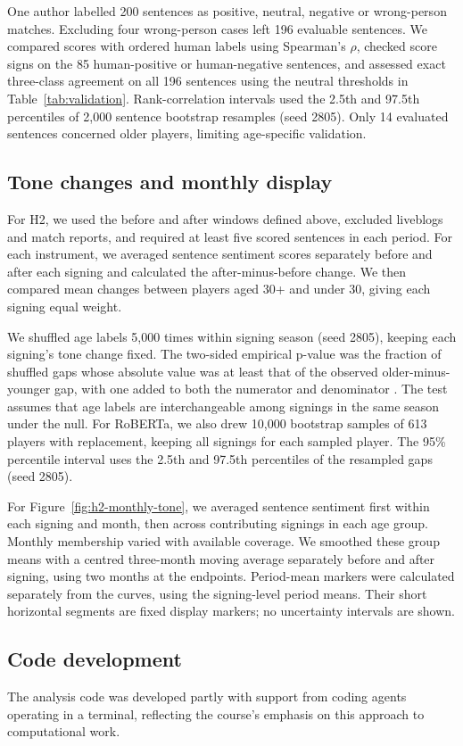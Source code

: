 One author labelled 200 sentences as positive, neutral, negative or wrong-person matches. Excluding four wrong-person cases left 196 evaluable sentences. We compared scores with ordered human labels using Spearman's $\rho$, checked score signs on the 85 human-positive or human-negative sentences, and assessed exact three-class agreement on all 196 sentences using the neutral thresholds in Table~\ref{tab:validation}. Rank-correlation intervals used the 2.5th and 97.5th percentiles of 2,000 sentence bootstrap resamples (seed 2805). Only 14 evaluated sentences concerned older players, limiting age-specific validation.

\subsection*{Tone changes and monthly display}

For H2, we used the before and after windows defined above, excluded liveblogs and match reports, and required at least five scored sentences in each period. For each instrument, we averaged sentence sentiment scores separately before and after each signing and calculated the after-minus-before change. We then compared mean changes between players aged 30+ and under 30, giving each signing equal weight.

We shuffled age labels 5,000 times within signing season (seed 2805), keeping each signing's tone change fixed. The two-sided empirical p-value was the fraction of shuffled gaps whose absolute value was at least that of the observed older-minus-younger gap, with one added to both the numerator and denominator \cite{hemerik2018exact,phipson2010permutation}. The test assumes that age labels are interchangeable among signings in the same season under the null. For RoBERTa, we also drew 10,000 bootstrap samples of 613 players with replacement, keeping all signings for each sampled player. The 95\% percentile interval uses the 2.5th and 97.5th percentiles of the resampled gaps (seed 2805). 

For Figure~\ref{fig:h2-monthly-tone}, we averaged sentence sentiment first within each signing and month, then across contributing signings in each age group. Monthly membership varied with available coverage. We smoothed these group means with a centred three-month moving average separately before and after signing, using two months at the endpoints. Period-mean markers were calculated separately from the curves, using the signing-level period means. Their short horizontal segments are fixed display markers; no uncertainty intervals are shown.

\subsection*{Code development}

The analysis code was developed partly with support from coding agents operating in a terminal, reflecting the course's emphasis on this approach to computational work.
